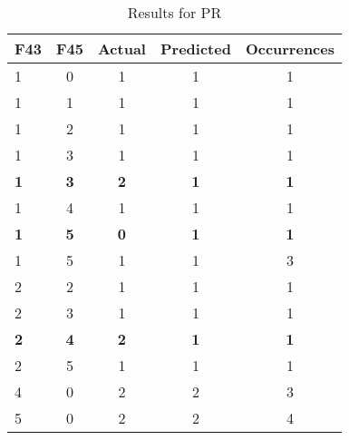 \begin{table}[htbp]
\centering
\begin{tabular}{|l|c|c|c|c|}
\hline
F43 & F45 & Actual & Predicted & Occurrences \\
\hline
1 & 0 & 1 & 1 & 1 \\
1 & 1 & 1 & 1 & 1 \\
1 & 2 & 1 & 1 & 1 \\
1 & 3 & 1 & 1 & 1 \\
\textbf{1} & \textbf{3} & \textbf{2} & \textbf{1} & \textbf{1} \\
1 & 4 & 1 & 1 & 1 \\
\textbf{1} & \textbf{5} & \textbf{0} & \textbf{1} & \textbf{1} \\
1 & 5 & 1 & 1 & 3 \\
2 & 2 & 1 & 1 & 1 \\
2 & 3 & 1 & 1 & 1 \\
\textbf{2} & \textbf{4} & \textbf{2} & \textbf{1} & \textbf{1} \\
2 & 5 & 1 & 1 & 1 \\
4 & 0 & 2 & 2 & 3 \\
5 & 0 & 2 & 2 & 4 \\
\hline
\end{tabular}
\caption{Results for PR}
\label{tab_analysis:PR_results}
\end{table}

